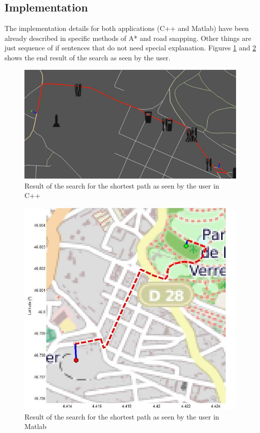 \subsection{Implementation}
The implementation details for both applications (C++ and Matlab) have been already described in specific methods of A* and road snapping. Other things are just sequence of if sentences that do not need special explanation.
Figures \ref{fig:ab_result_cpp} and \ref{fig:ab_result_matlab} shows the end result of the search as seen by the user.
\begin{figure}[h]
\centering
\includegraphics[width=0.8\linewidth]{../pictures/search_ab_result.jpg}
\caption{Result of the search for the shortest path as seen by the user in C++}
\label{fig:ab_result_cpp}
\end{figure}
\begin{figure}[h]
\centering
\includegraphics[width=0.6\linewidth]{../pictures/search_ab_matlab.jpg}
\caption{Result of the search for the shortest path as seen by the user in Matlab}
\label{fig:ab_result_matlab}
\end{figure}

